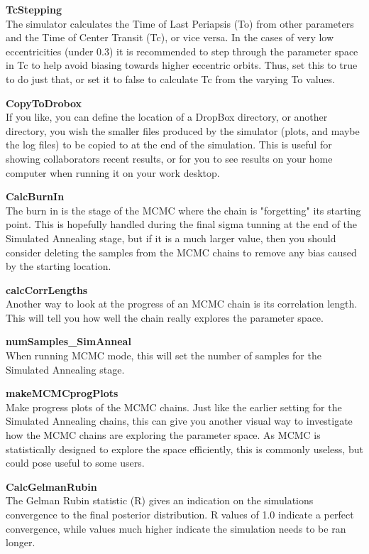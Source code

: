 \documentclass[12pt,preprint]{aastex}
\begin{document}
{\bf TcStepping}\\
The simulator calculates the Time of Last Periapsis (To) from other parameters and the Time of Center Transit (Tc), or vice versa.  In the cases of very low eccentricities (under 0.3) it is recommended to step through the parameter space in Tc to help avoid biasing towards higher eccentric orbits.  Thus, set this to true to do just that, or set it to false to calculate Tc from the varying To values.

{\bf CopyToDrobox}\\
If you like, you can define the location of a DropBox directory, or another directory, you wish the smaller files produced by the simulator (plots, and maybe the log files) to be copied to at the end of the simulation.  This is useful for showing collaborators recent results, or for you to see results on your home computer when running it on your work desktop.

{\bf CalcBurnIn}\\
The burn in is the stage of the MCMC where the chain is "forgetting" its starting point.  This is hopefully handled during the final sigma tunning at the end of the Simulated Annealing stage, but if it is a much larger value, then you should consider deleting the samples from the MCMC chains to remove any bias caused by the starting location.

{\bf calcCorrLengths}\\
Another way to look at the progress of an MCMC chain is its correlation length.  This will tell you how well the chain really explores the parameter space.

{\bf numSamples\_SimAnneal}\\
When running MCMC mode, this will set the number of samples for the Simulated Annealing stage.

{\bf makeMCMCprogPlots}\\
Make progress plots of the MCMC chains.  Just like the earlier setting for the Simulated Annealing chains, this can give you another visual way to investigate how the MCMC chains are exploring the parameter space.  As MCMC is statistically designed to explore the space efficiently, this is commonly useless, but could pose useful to some users.

{\bf CalcGelmanRubin}\\
The Gelman Rubin statistic (R) gives an indication on the simulations convergence to the final posterior distribution.  R values of 1.0 indicate a perfect convergence, while values much higher indicate the simulation needs to be ran longer.
\end{document}

